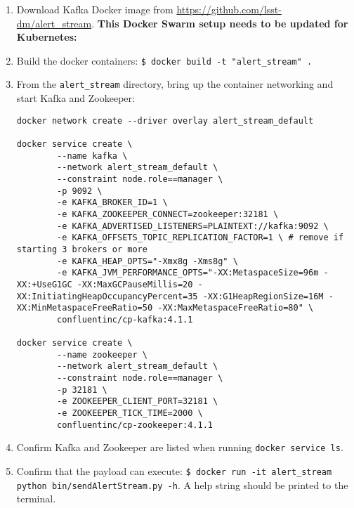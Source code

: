 \begin{enumerate}


	\item{Download Kafka Docker image from \url{https://github.com/lsst-dm/alert\_stream}.}
\textbf{This Docker Swarm setup needs to be updated for Kubernetes:}
	\item{Build the docker containers: \texttt{\$ docker build -t "alert\_stream" .}}
	\item{From the \texttt{alert\_stream} directory, bring up the container networking and start Kafka and Zookeeper:

\begin{verbatim}
docker network create --driver overlay alert_stream_default

docker service create \
        --name kafka \
        --network alert_stream_default \
        --constraint node.role==manager \
        -p 9092 \
        -e KAFKA_BROKER_ID=1 \
        -e KAFKA_ZOOKEEPER_CONNECT=zookeeper:32181 \
        -e KAFKA_ADVERTISED_LISTENERS=PLAINTEXT://kafka:9092 \
        -e KAFKA_OFFSETS_TOPIC_REPLICATION_FACTOR=1 \ # remove if starting 3 brokers or more
        -e KAFKA_HEAP_OPTS="-Xmx8g -Xms8g" \
        -e KAFKA_JVM_PERFORMANCE_OPTS="-XX:MetaspaceSize=96m -XX:+UseG1GC -XX:MaxGCPauseMillis=20 -XX:InitiatingHeapOccupancyPercent=35 -XX:G1HeapRegionSize=16M -XX:MinMetaspaceFreeRatio=50 -XX:MaxMetaspaceFreeRatio=80" \
        confluentinc/cp-kafka:4.1.1

docker service create \
        --name zookeeper \
        --network alert_stream_default \
        --constraint node.role==manager \
        -p 32181 \
        -e ZOOKEEPER_CLIENT_PORT=32181 \
        -e ZOOKEEPER_TICK_TIME=2000 \
        confluentinc/cp-zookeeper:4.1.1
\end{verbatim}}

	\item{Confirm Kafka and Zookeeper are listed when running \texttt{docker service ls}.}

	\item{Confirm that the payload can execute: \texttt{\$ docker run -it alert\_stream python bin/sendAlertStream.py -h}.  A help string should be printed to the terminal.}

\end{enumerate}
